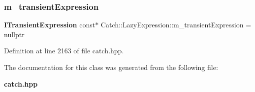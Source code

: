 \mbox{\label{class_catch_1_1_lazy_expression_a5a9ce4c2401a262c21b4e107551180bc}} 
\subsubsection{m\_transientExpression}
{\footnotesize\ttfamily \textbf{ I\+Transient\+Expression} const$\ast$ Catch\+::\+Lazy\+Expression\+::m\+\_\+transient\+Expression = nullptr\hspace{0.3cm}{\ttfamily [private]}}



Definition at line 2163 of file catch.\+hpp.



The documentation for this class was generated from the following file\+:\begin{DoxyCompactItemize}
\item 
\textbf{ catch.\+hpp}\end{DoxyCompactItemize}
